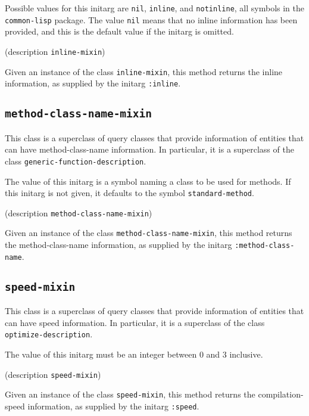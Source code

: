 
Possible values for this initarg are \texttt{nil}, \texttt{inline},
and \texttt{notinline}, all symbols in the \texttt{common-lisp}
package.  The value \texttt{nil} means that no inline information has
been provided, and this is the default value if the initarg is omitted.

 {(description {\tt inline-mixin})}

Given an instance of the class \texttt{inline-mixin}, this method
returns the inline information, as supplied by the initarg
\texttt{:inline}.

\subsection{\texttt{method-class-name-mixin}}
\label{sec-method-class-name-mixin}

This class is a superclass of query classes that provide information
of entities that can have method-class-name information.  In
particular, it is a superclass of the class
\texttt{generic-function-description}.


The value of this initarg is a symbol naming a class to be used for
methods.  If this initarg is not given, it defaults to the symbol
\texttt{standard-method}.

 {(description {\tt method-class-name-mixin})}

Given an instance of the class \texttt{method-class-name-mixin}, this
method returns the method-class-name information, as supplied by the
initarg \texttt{:method-class-name}.

\subsection{\texttt{speed-mixin}}
\label{sec-speed-mixin}

This class is a superclass of query classes that provide information
of entities that can have speed information.  In particular, it is a
superclass of the class \texttt{optimize-description}.


The value of this initarg must be an integer between $0$ and $3$
inclusive.

 {(description {\tt speed-mixin})}

Given an instance of the class \texttt{speed-mixin}, this method
returns the compilation-speed information, as supplied by the initarg
\texttt{:speed}.

